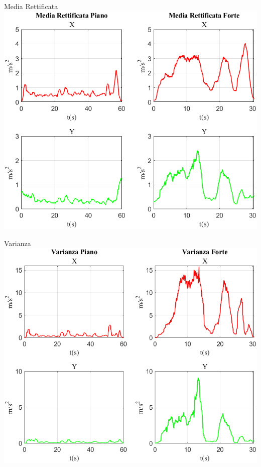 \documentclass[beamer]{standalone}
\begin{document}
	\begin{frame}{{Media Rettificata}}
		\centering\includegraphics[height=.8\textheight]{figure/Acc/Media Rettificata}
	\end{frame}

	\begin{frame}{{Varianza}}
		\centering\includegraphics[height=.8\textheight]{figure/Acc/Varianza}
	\end{frame}
	
	
\end{document}
